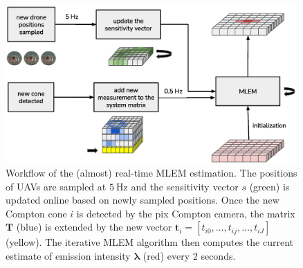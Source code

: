 \begin{figure}[htb]
  \centering
    \includegraphics[width=0.99\textwidth]{./fig/photos/workflow.eps}
  \caption{Workflow of the (almost) real-time \ac{MLEM} estimation. The positions of \ac{UAV}s are sampled at $\SI{5}{\hertz}$ and the sensitivity vector $s$ (green) is updated online based on newly sampled positions.
  Once the new Compton cone $i$ is detected by the \ac{pix} Compton camera, 
  the matrix $\mathbf{T}$ (blue) is extended by the new vector $\mathbf{t}_{i} = [t_{i0}, \dots,t_{ij}, \dots, t_{iJ}]$ (yellow).
  The iterative \ac{MLEM} algorithm then computes the current estimate of emission intensity $\bm{\lambda}$ (red) every $2$ seconds.
  }
    \label{fig:online_mlem}
\end{figure}%

%

